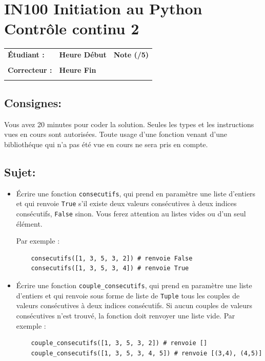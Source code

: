 \documentclass[a4paper,11pt]{article}
\begin{document}
\newpage


\section*{\center IN100 Initiation au Python\\
Contrôle continu 2}


\begin{table}[h!]
\centering
\renewcommand{\arraystretch}{1.4} %
\begin{tabular}{|p{10cm}|p{3cm}|p{2cm}|}
\hline
\textbf{Étudiant :} & \textbf{Heure Début }  & \textbf{Note (/5) }  \\
& & \\
\hline
\textbf{Correcteur :} & \textbf{Heure Fin } & \\
& & \\
\hline

\hline
\end{tabular}
\end{table}

\subsection*{Consignes:} Vous avez 20 minutes pour coder la solution. Seules les types et les instructions vues en cours sont autorisées. Toute usage d'une fonction 
venant d'une bibliothéque qui n'a pas été vue en cours ne sera pris en compte. 

\subsection*{Sujet:}

\begin{itemize}
\item[1.] \'Ecrire une fonction \texttt{consecutifs}, qui prend en paramètre une liste d’entiers et qui renvoie \texttt{True} s’il existe deux valeurs consécutives à deux indices consécutifs, \texttt{False} sinon.
Vous ferez attention au listes vides ou d’un seul élément.

Par exemple :
\begin{verbatim}
	consecutifs([1, 3, 5, 3, 2]) # renvoie False
	consecutifs([1, 3, 5, 3, 4]) # renvoie True
\end{verbatim}

\item[2.] \'Ecrire une fonction \texttt{couple\_consecutifs}, qui prend en paramètre une liste d’entiers et qui renvoie sous forme de liste de \texttt{Tuple} tous les couples de valeurs consécutives à deux indices consécutifs. Si aucun couples de valeurs consécutives n’est trouvé, la fonction doit renvoyer une liste vide.
Par exemple :
\begin{verbatim}
	couple_consecutifs([1, 3, 5, 3, 2]) # renvoie []
	couple_consecutifs([1, 3, 5, 3, 4, 5]) # renvoie [(3,4), (4,5)]
\end{verbatim}

\end{itemize}
\end{document}
